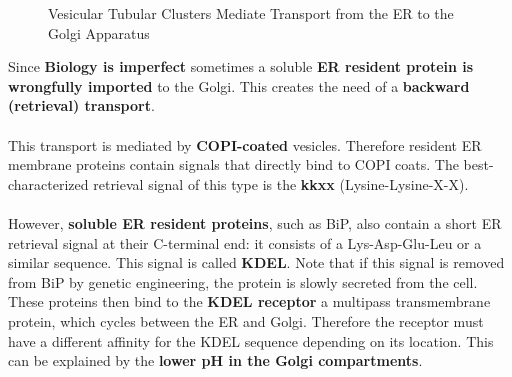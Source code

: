 \documentclass[../main.tex]{subfiles}
\begin{document}
\begin{figure}[H]
	\centering
	\caption{Vesicular Tubular Clusters Mediate Transport from the ER to the Golgi Apparatus }
\end{figure}

Since \textbf{Biology is imperfect} sometimes a soluble \textbf{ER resident protein is wrongfully imported} to the Golgi. This creates the need of a \textbf{backward (retrieval) transport}. \\
\\
This transport is mediated by \textbf{COPI-coated} vesicles. Therefore resident ER membrane proteins contain signals that directly bind to COPI coats. The best-characterized retrieval signal of this type is the \textbf{\gls{kkxx}} (Lysine-Lysine-X-X). \\
\\
However, \textbf{soluble ER resident proteins}, such as BiP, also contain a short ER retrieval signal at their C-terminal end: it consists of a Lys-Asp-Glu-Leu or a similar sequence. This signal is called \textbf{\gls{KDEL}}. Note that if this signal is removed from BiP by genetic engineering, the protein is slowly secreted from the cell. \\
\indent These proteins then bind to the \textbf{KDEL receptor} a multipass transmembrane protein, which cycles between the ER and Golgi. Therefore the receptor must have a different affinity for the KDEL sequence depending on its location. This can be explained by the \textbf{lower pH in the Golgi compartments}. 
\end{document}
